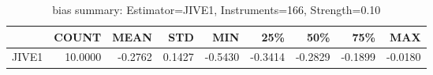 \begin{table}[ht]
\centering
\caption{bias summary: Estimator=JIVE1, Instruments=166, Strength=0.10}
\begin{tabular}{lrrrrrrrr}
\toprule
 & COUNT & MEAN & STD & MIN & 25\% & 50\% & 75\% & MAX \\
\midrule
JIVE1 & 10.0000 & -0.2762 & 0.1427 & -0.5430 & -0.3414 & -0.2829 & -0.1899 & -0.0180 \\
\bottomrule
\end{tabular}
\end{table}
